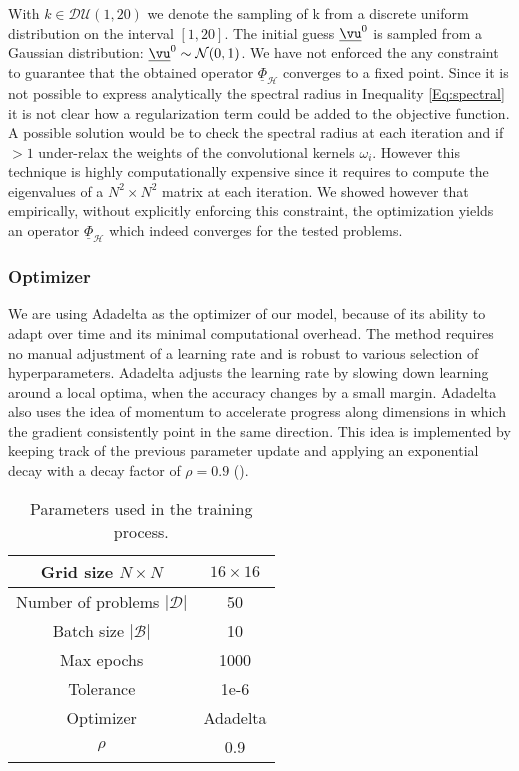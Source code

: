 \documentclass{article} %
\begin{document}
With $k \in \mathcal{DU}(1, 20)$ we denote the sampling of k from a discrete uniform distribution on the interval $[1, 20]$. The initial guess $\underline{\vu}^0$ is sampled from a Gaussian distribution: $\underline{\vu}^0 \sim \mathcal{N}(0, 1)$. We have not enforced the any constraint to guarantee that the obtained operator $\underline{\Phi}_{\mathcal{H}}$ converges to a fixed point. Since it is not possible to express analytically the spectral radius in Inequality \ref{Eq:spectral} it is not clear how a regularization term could be added to the objective function.
A possible solution would be to check the spectral radius at each iteration and if $>1$ under-relax the weights of the convolutional kernels $\omega_i$.
However this technique is highly computationally expensive since it requires to compute the eigenvalues of a $N^2\times N^2$ matrix at each iteration. 
We showed however that empirically, without explicitly enforcing this constraint, the optimization yields an operator $\underline{\Phi}_{\mathcal{H}}$ which indeed converges for the tested problems.



\subsubsection{Optimizer}
We are using Adadelta as the optimizer of our model, because of its ability to adapt over time and its minimal computational overhead. The method requires no manual adjustment of a learning rate and is robust to various selection of hyperparameters. Adadelta adjusts the learning rate by slowing down learning around a local optima, when the accuracy changes by a small margin. Adadelta also uses the idea of momentum to accelerate progress along dimensions in which the gradient consistently point in the same direction. This idea is implemented by keeping track of the previous parameter update and applying an exponential decay with a decay factor of $\rho = 0.9$ (\cite{adadelta_ref}). \\

\begin{table}[h]
\centering
\caption{Parameters used in the training process.}
\begin{tabular}{| c | c |}
	  \hline
      Grid size $N\times N$  & $16\times 16$ \\
      \hline
      Number of problems $|\mathcal{D}|$  & 50 \\
      \hline
      Batch size $|\mathcal{B}|$ & 10  \\
      \hline
      Max epochs & 1000 \\
      \hline
      Tolerance &  1e-6  \\
      \hline
      Optimizer  & Adadelta   \\
      \hline
      $\rho$ & 0.9  \\
      \hline
\end{tabular}
\label{table:parameters}
\end{table}
\end{document}

